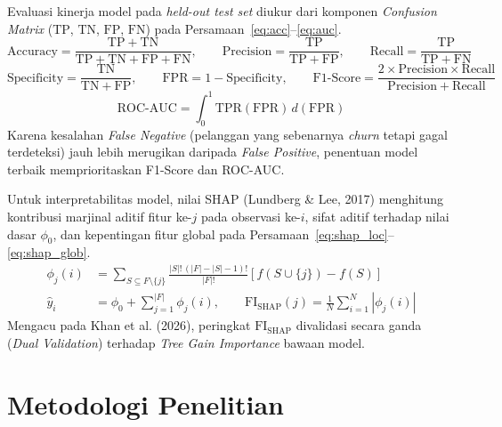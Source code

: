 \documentclass[11pt,a4paper]{article}
\begin{document}
Evaluasi kinerja model pada \textit{held-out test set} diukur dari komponen \textit{Confusion Matrix} ($\mathrm{TP}$, $\mathrm{TN}$, $\mathrm{FP}$, $\mathrm{FN}$) pada Persamaan~\eqref{eq:acc}--\eqref{eq:auc}.
\begin{equation}
  \mathrm{Accuracy} = \frac{\mathrm{TP} + \mathrm{TN}}{\mathrm{TP} + \mathrm{TN} + \mathrm{FP} + \mathrm{FN}}, \qquad
  \mathrm{Precision} = \frac{\mathrm{TP}}{\mathrm{TP} + \mathrm{FP}}, \qquad
  \mathrm{Recall} = \frac{\mathrm{TP}}{\mathrm{TP} + \mathrm{FN}}
  \label{eq:acc}
\end{equation}
\begin{equation}
  \mathrm{Specificity} = \frac{\mathrm{TN}}{\mathrm{TN} + \mathrm{FP}}, \qquad
  \mathrm{FPR} = 1 - \mathrm{Specificity}, \qquad
  \mathrm{F1\text{-}Score} = \frac{2 \times \mathrm{Precision} \times \mathrm{Recall}}{\mathrm{Precision} + \mathrm{Recall}}
  \label{eq:f1}
\end{equation}
\begin{equation}
  \mathrm{ROC\text{-}AUC} = \int_{0}^{1} \mathrm{TPR}(\mathrm{FPR})\, d(\mathrm{FPR})
  \label{eq:auc}
\end{equation}
Karena kesalahan \textit{False Negative} (pelanggan yang sebenarnya \textit{churn} tetapi gagal terdeteksi) jauh lebih merugikan daripada \textit{False Positive}, penentuan model terbaik memprioritaskan F1-Score dan ROC-AUC.

Untuk interpretabilitas model, nilai SHAP (Lundberg \& Lee, 2017) menghitung kontribusi marjinal aditif fitur ke-$j$ pada observasi ke-$i$, sifat aditif terhadap nilai dasar $\phi_0$, dan kepentingan fitur global pada Persamaan~\eqref{eq:shap_loc}--\eqref{eq:shap_glob}.
\begin{align}
  \phi_j(i) &= \sum_{S \subseteq F \setminus \{j\}} \frac{|S|!\,(|F| - |S| - 1)!}{|F|!} \left[ f(S \cup \{j\}) - f(S) \right]
  \label{eq:shap_loc} \\
  \hat{y}_i &= \phi_0 + \sum_{j=1}^{|F|} \phi_j(i), \qquad
  \mathrm{FI}_{\mathrm{SHAP}}(j) = \frac{1}{N} \sum_{i=1}^{N} |\phi_j(i)|
  \label{eq:shap_glob}
\end{align}
Mengacu pada Khan et al. (2026), peringkat $\mathrm{FI}_{\mathrm{SHAP}}$ divalidasi secara ganda (\textit{Dual Validation}) terhadap \textit{Tree Gain Importance} bawaan model.

\section{Metodologi Penelitian}
\end{document}
